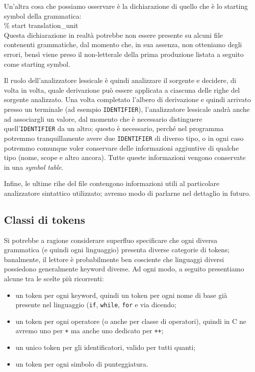 \documentclass[class=book, crop=false, oneside, 12pt]{standalone}
\begin{document}
Un'altra cosa che possiamo osservare è la dichiarazione di quello che è lo starting symbol della grammatica:\\
\% start translation\_unit\\
Questa dichiarazione in realtà potrebbe non essere presente su alcuni file contenenti grammatiche, dal momento che, in sua assenza, non otteniamo degli errori, bensì viene preso il non-letterale della prima produzione listata a seguito come starting symbol.

Il ruolo dell’analizzatore lessicale è quindi analizzare il sorgente e decidere, di volta in volta, quale derivazione può essere applicata a ciascuna delle righe del sorgente analizzato. Una volta completato l'albero di derivazione e quindi arrivato presso un terminale (ad esempio \texttt{IDENTIFIER}), l'analizzatore lessicale andrà anche ad associargli un valore, dal momento che è necessario distinguere quell'\texttt{IDENTIFIER} da un altro; questo è necessario, perché nel programma potremmo tranquillamente avere due \texttt{IDENTIFIER} di diverso tipo, o in ogni caso potremmo comunque voler conservare delle informazioni aggiuntive di qualche tipo (nome, scope e altro ancora). Tutte queste informazioni vengono conservate in una \emph{symbol table}.

Infine, le ultime rihe del file contengono informazioni utili al particolare analizzatore sintattico utilizzato; avremo modo di parlarne nel dettaglio in futuro.

\subsection{Classi di tokens}
Si potrebbe a ragione considerare superfluo specificare che ogni diversa grammatica (e quindi ogni linguaggio) presenta diverse categorie di tokens; banalmente, il lettore è probabilmente ben cosciente che linguaggi diversi possiedono generalmente keyword diverse. Ad ogni modo, a seguito presentiamo alcune tra le scelte più ricorrenti:
\begin{itemize}
    \item un token per ogni keyword, quindi un token per ogni nome di base già presente nel linguaggio (\texttt{if}, \texttt{while}, \texttt{for} e via dicendo;
    \item un token per ogni operatore (o anche per classe di operatori), quindi in C ne avremo uno per \texttt{+} ma anche uno dedicato per \texttt{++}; 
    \item un unico token per gli identificatori, valido per tutti quanti;
    \item un token per ogni simbolo di punteggiatura. 
\end{itemize}
\end{document}
